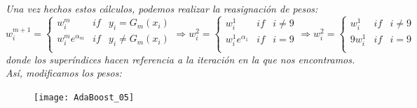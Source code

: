 \documentclass[12pt,twoside]{article}
\begin{document}
\textit{Una vez hechos estos cálculos, podemos realizar la reasignación de pesos:}
\begin{equation*}
w_i^{m+1} =
\left\{
\begin{array}{crl}
w_i^m & if & y_i = G_m(x_i) \\
w_i^m e^{\alpha_m} & if & y_i \neq G_m(x_i) \\
\end{array}
\right.
\Rightarrow
w_i^{2} =
\left\{
\begin{array}{crl}
w_i^1 & if & i \neq 9 \\
w_i^1 e^{\alpha_1} & if & i = 9 \\
\end{array}
\right.
\Rightarrow
w_i^{2} =
\left\{
\begin{array}{crl}
w_i^1 & if & i \neq 9 \\
9 w_i^1  & if & i = 9 \\
\end{array}
\right.
\end{equation*}
\noindent
\textit{donde los superíndices hacen referencia a la iteración en la que nos encontramos. Así, modificamos los pesos: }
\begin{figure}[h]
\centering
\texttt{[image: AdaBoost\_05]}
\end{figure}
\end{document}
